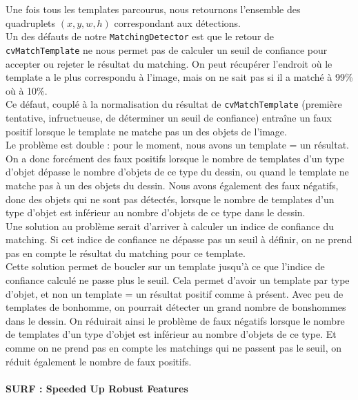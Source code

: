 Une fois tous les templates parcourus, nous retournons l'ensemble des quadruplets $(x,y,w,h)$ correspondant aux détections.\\

Un des défauts de notre \texttt{MatchingDetector} est que le retour de\\ \texttt{cvMatchTemplate} ne nous permet pas de calculer un seuil de confiance pour accepter ou rejeter le résultat du matching. On peut récupérer l'endroit où le template a le plus correspondu à l'image, mais on ne sait pas si il a matché à 99\% où à 10\%.\\

Ce défaut, couplé à la normalisation du résultat de \texttt{cvMatchTemplate} (première tentative, infructueuse, de déterminer un seuil de confiance) entraîne un faux positif lorsque le template ne matche pas un des objets de l'image.\\ Le problème est double : pour le moment, nous avons un template = un résultat. On a donc forcément des faux positifs lorsque le nombre de templates d'un type d'objet dépasse le nombre d'objets de ce type du dessin, ou quand le template ne matche pas à un des objets du dessin. Nous avons également des faux négatifs, donc des objets qui ne sont pas détectés, lorsque le nombre de templates d'un type d'objet est inférieur au nombre d'objets de ce type dans le dessin.\\

Une solution au problème serait d'arriver à calculer un indice de confiance du matching. Si cet indice de confiance ne dépasse pas un seuil à définir, on ne prend pas en compte le résultat du matching pour ce template.\\

Cette solution permet de boucler sur un template jusqu'à ce que l'indice de confiance calculé ne passe plus le seuil. Cela permet d'avoir un template par type d'objet, et non un template = un résultat positif comme à présent. Avec peu de templates de bonhomme, on pourrait détecter un grand nombre de bonshommes dans le dessin. On réduirait ainsi le problème de faux négatifs lorsque le nombre de templates d'un type d'objet est inférieur au nombre d'objets de ce type. Et comme on ne prend pas en compte les matchings qui ne passent pas le seuil, on réduit également le nombre de faux positifs.\\


\paragraph{SURF : Speeded Up Robust Features\\}

